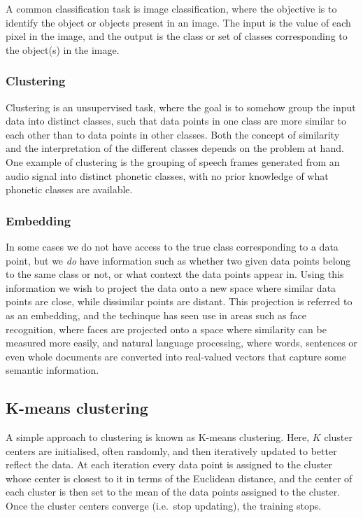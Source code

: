 A common classification task is image classification, where the objective is to identify the object or objects present in an image.
The input is the value of each pixel in the image, and the output is the class or set of classes corresponding to the object(s) in the image.

\subsubsection{Clustering}

Clustering is an unsupervised task, where the goal is to somehow group the input data into distinct classes, such that data points in one class are more similar to each other than to data points in other classes.
Both the concept of similarity and the interpretation of the different classes depends on the problem at hand.
One example of clustering is the grouping of speech frames generated from an audio signal into distinct phonetic classes, with no prior knowledge of what phonetic classes are available.

\subsubsection{Embedding}

In some cases we do not have access to the true class corresponding to a data point, but we \emph{do} have information such as whether two given data points belong to the same class or not, or what context the data points appear in.
Using this information we wish to project the data onto a new space where similar data points are close, while dissimilar points are distant.
This projection is referred to as an embedding, and the techinque has seen use in areas such as face recognition, where faces are projected onto a space where similarity can be measured more easily, and natural language processing, where words, sentences or even whole documents are converted into real-valued vectors that capture some semantic information.

\subsection{K-means clustering}

A simple approach to clustering is known as K-means clustering.
Here, $K$ cluster centers are initialised, often randomly, and then iteratively updated to better reflect the data.
At each iteration every data point is assigned to the cluster whose center is closest to it in terms of the Euclidean distance, and the center of each cluster is then set to the mean of the data points assigned to the cluster.
Once the cluster centers converge (i.e.\ stop updating), the training stops.


